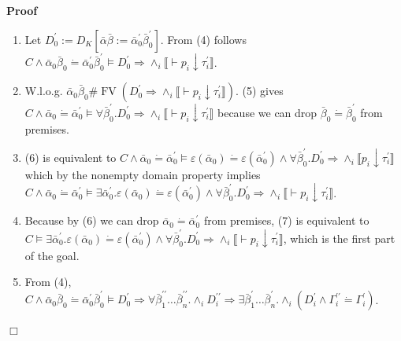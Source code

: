 \documentclass{article}
\newcommand{\assign}{:=}
\newcommand{\tmop}[1]{\ensuremath{\operatorname{#1}}}
\newenvironment{proof}{\noindent\textbf{Proof\ }}{\hspace*{\fill}$\Box$\medskip}
\begin{document}
\begin{proof}
\begin{itemize}
\begin{enumerate}
      \item Let $D_0^{\prime} \assign D_K [\bar{\alpha} \bar{\beta} \assign
      \bar{\alpha}_0^{\prime} \bar{\beta}_0^{\prime}]$. From (4) follows $C
      \wedge \bar{\alpha}_0 \bar{\beta}_0 \dot{=} \bar{\alpha}_0^{\prime}
      \bar{\beta}_0^{\prime} \vDash D_0^{\prime} \Rightarrow \wedge_i
      \llbracket \vdash p_i \downarrow \tau_i^{\prime} \rrbracket$.
      
      \item W.l.o.g. $\bar{\alpha}_0 \bar{\beta}_0 \# \tmop{FV} (D_0^{\prime}
      \Rightarrow \wedge_i \llbracket \vdash p_i \downarrow \tau_i^{\prime}
      \rrbracket)$. (5) gives $C \wedge \bar{\alpha}_0 \dot{=}
      \bar{\alpha}_0^{\prime} \vDash \forall \bar{\beta}_0^{\prime}
      .D_0^{\prime} \Rightarrow \wedge_i \llbracket \vdash p_i \downarrow
      \tau_i^{\prime} \rrbracket$ because we can drop $\bar{\beta}_0 \dot{=}
      \bar{\beta}_0^{\prime}$ from premises.
      
      \item (6) is equivalent to $C \wedge \bar{\alpha}_0 \dot{=}
      \bar{\alpha}_0^{\prime} \vDash \varepsilon (\bar{\alpha}_0) \dot{=}
      \varepsilon (\bar{\alpha}_0^{\prime}) \wedge \forall
      \bar{\beta}_0^{\prime} .D_0^{\prime} \Rightarrow \wedge_i \llbracket p_i
      \downarrow \tau_i^{\prime} \rrbracket$ which by the nonempty domain
      property implies $C \wedge \bar{\alpha}_0 \dot{=}
      \bar{\alpha}_0^{\prime} \vDash \exists \bar{\alpha}_0^{\prime} .
      \varepsilon (\bar{\alpha}_0) \dot{=} \varepsilon
      (\bar{\alpha}_0^{\prime}) \wedge \forall \bar{\beta}_0^{\prime}
      .D_0^{\prime} \Rightarrow \wedge_i \llbracket \vdash p_i \downarrow
      \tau_i^{\prime} \rrbracket$.
      
      \item Because by (6) we can drop $\bar{\alpha}_0 \dot{=}
      \bar{\alpha}_0^{\prime}$ from premises, (7) is equivalent to $C \vDash
      \exists \bar{\alpha}_0^{\prime} . \varepsilon (\bar{\alpha}_0) \dot{=}
      \varepsilon (\bar{\alpha}_0^{\prime}) \wedge \forall
      \bar{\beta}_0^{\prime} .D_0^{\prime} \Rightarrow \wedge_i \llbracket
      \vdash p_i \downarrow \tau_i^{\prime} \rrbracket$, which is the first
      part of the goal.
      
      \item From (4), $C \wedge \bar{\alpha}_0 \bar{\beta}_0 \dot{=}
      \bar{\alpha}_0^{\prime} \bar{\beta}_0^{\prime} \vDash D_0^{\prime}
      \Rightarrow \forall \bar{\beta}_1^{\prime\prime} \ldots
      \bar{\beta}_n^{\prime\prime} . \wedge_i D_i^{\prime\prime} \Rightarrow
      \exists \bar{\beta}_1^{\prime} \ldots \bar{\beta}_n^{\prime} . \wedge_i
      (D_i^{\prime} \wedge \Gamma_i^{\prime\prime} \dot{=}
      \Gamma_i^{\prime})$.
      

\end{enumerate}
\end{itemize}
\end{proof}
\end{document}

